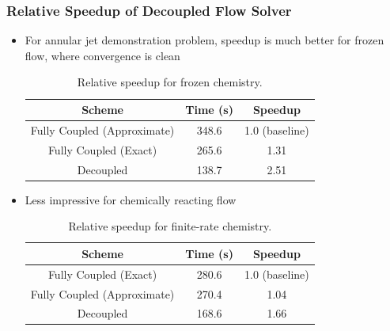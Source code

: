 \documentclass{beamer}
\begin{document}
\begin{frame}
  \frametitle{Relative Speedup of Decoupled Flow Solver}
  \begin{itemize}
    \item For annular jet demonstration problem, speedup is much better for
      frozen flow, where convergence is clean
\begin{table}[h]
  \tiny
  \centering
  \begin{tabular}{c|c|c}
    Scheme & Time (s) & Speedup \\
    \hline
    Fully Coupled (Approximate) & 348.6 & 1.0 (baseline) \\
    Fully Coupled (Exact)       & 265.6 & 1.31 \\
    Decoupled                   & 138.7 & 2.51
  \end{tabular}
  \caption{Relative speedup for frozen chemistry.}
  \label{tab:srp-rel-speedup-frozen}
\end{table}
    \item Less impressive for chemically reacting flow
\begin{table}[h]
  \tiny
  \centering
  \begin{tabular}{c|c|c}
    Scheme & Time (s) & Speedup \\
    \hline
    Fully Coupled (Exact)       & 280.6 & 1.0 (baseline) \\
    Fully Coupled (Approximate) & 270.4 & 1.04 \\
    Decoupled                   & 168.6 & 1.66
  \end{tabular}
  \caption{Relative speedup for finite-rate chemistry.}
  \label{tab:srp-rel-speedup-chem}
\end{table}
  \end{itemize}
\end{frame}
\end{document}
